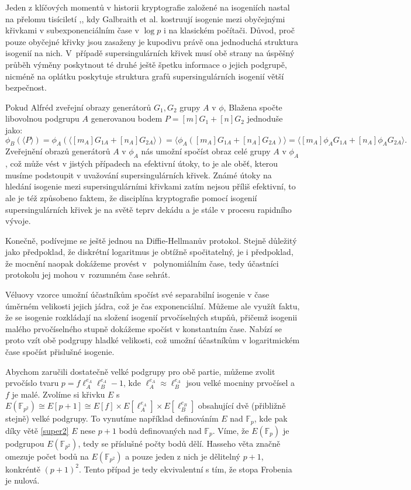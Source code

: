 \documentclass[12pt]{report}
\begin{document}
Jeden z klíčových momentů v historii kryptografie založené na isogeniích nastal na přelomu tisíciletí \cite{Galbraith},\cite{Galbraith2}, kdy Galbraith et al. kostruují isogenie mezi obyčejnými křivkami v subexponenciálním čase v $\log p$ i na klasickém počítači. Důvod, proč pouze obyčejné křivky jsou zasaženy je kupodivu právě ona jednoduchá struktura isogenií na nich. V~případě supersingulárních křivek musí obě strany na úspěšný průběh výměny poskytnout té druhé ještě špetku informace o jejich podgrupě, nicméně na oplátku poskytuje struktura grafů supersingulárních isogenií větší bezpečnost.

Pokud Alfréd zveřejní obrazy generátorů $G_{1},G_{2}$ grupy $A$ v $\phi$, Blažena spočte libovolnou podgrupu $A$ generovanou bodem $P = [m]G_{1} + [n]G_2$ jednoduše jako:
\begin{equation*}\label{clubsuit}
\phi_B (\langle P \rangle) = \phi_A (\langle [m_A] G_{1A} + [n_A] G_{2A} \rangle) = \langle \phi_A ([m_A] G_{1A} + [n_A] G_{2A}) \rangle = \langle [m_A] \phi_A G_{1A} + [n_A] \phi_A G_{2A} \rangle. \tag{$\clubsuit$}
\end{equation*}
Zveřejnění obrazů generátorů $A$ v $\phi_A$ nás umožní spočíst obraz celé grupy $A$ v $\phi_A$, což může vést v jistých případech na efektivní útoky, to je ale oběť, kterou musíme podstoupit v uvažování supersingulárních křivek. Známé útoky na hledání isogenie mezi supersingulárními křivkami zatím nejsou příliš efektivní, to ale je též způsobeno faktem, že disciplína kryptografie pomocí isogenií supersingulárních křivek je na světě teprv dekádu a je stále v procesu rapidního vývoje.

Konečně, podívejme se ještě jednou na Diffie-Hellmanův protokol. Stejně důležitý jako předpoklad, že diskrétní logaritmus je obtížně spočitatelný, je i předpoklad, že mocnění naopak dokážeme provést v~ polynomiálním čase, tedy účastníci protokolu jej mohou v~rozumném čase sehrát.

Véluovy vzorce umožní účastníkům spočíst své separabilní isogenie v čase úměrném velikosti jejich jádra, což je čas exponenciální. Můžeme ale využít faktu, že se isogenie rozkládají na složení isogenií prvočíselných stupňů, přičemž isogenii malého prvočíselného stupně dokážeme spočíst v konstantním čase. Nabízí se proto vzít obě podgrupy hladké velikosti, což umožní účastníkům v logaritmickém čase spočíst přislušné isogenie.

Abychom zaručili dostatečně velké podgrupy pro obě partie, můžeme zvolit prvočíslo tvaru $p = f \ell_A ^{e_A} \ell_B ^ {e_A} - 1$, kde $\ell_A ^ {e_A} \approx \ell_B ^{e_A}$ jsou velké mocniny prvočísel a $f$ je malé. Zvolíme si křivku $E$ s $E(\mathbb{F}_{p^2}) \cong E[p+1] \cong E[f] \times E[\ell_A ^{e_A}] \times E[\ell_B ^{e_B}]$ obsahující dvě (přibližně stejně) velké podgrupy. To vynutíme například definováním $E$ nad $\mathbb{F}_p$, kde pak díky větě \ref{super2} $E$ nese $p+1$ bodů definovaných nad $\mathbb{F}_p$. Víme, že $E(\mathbb{F}_p)$ je podgrupou $E(\mathbb{F}_{p^2})$, tedy se příslušné počty bodů dělí. Hasseho věta značně omezuje počet bodů na $E(\mathbb{F}_{p^2})$ a pouze jeden z nich je dělitelný $p+1$, konkréntě $(p+1)^2$. Tento případ je tedy ekvivalentní s tím, že stopa Frobenia je nulová.
\end{document}
